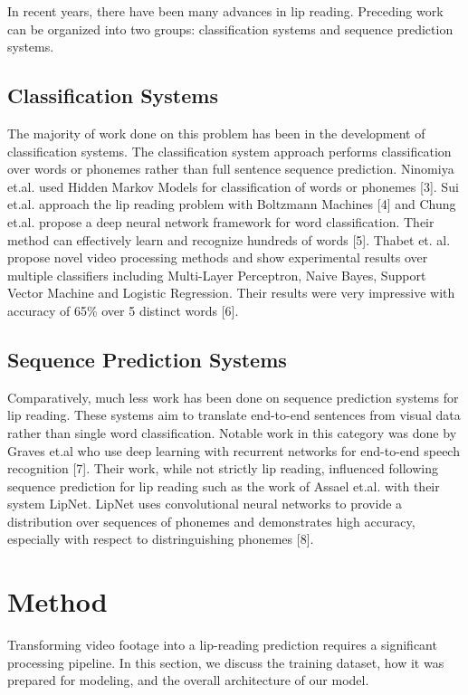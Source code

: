 \documentclass{article}
\begin{document}
In recent years, there have been many advances in lip reading. Preceding work can be organized into two groups: classification systems and sequence prediction systems. 

\subsection{Classification Systems}

The majority of work done on this problem has been in the development of classification systems. The classification system approach performs classification over words or phonemes rather than full sentence sequence prediction. Ninomiya et.al. used Hidden Markov Models for classification of words or phonemes [3]. Sui et.al. approach the lip reading problem with Boltzmann Machines [4] and Chung et.al. propose a deep neural network framework for word classification. Their method can effectively learn and recognize hundreds of words [5]. Thabet et. al. propose novel video processing methods and show experimental results over multiple classifiers including Multi-Layer Perceptron, Naive Bayes, Support Vector Machine and Logistic Regression. Their results were very impressive with accuracy of 65\% over 5 distinct words [6].

\subsection{Sequence Prediction Systems}

Comparatively, much less work has been done on sequence prediction systems for lip reading. These systems aim to translate end-to-end sentences from visual data rather than single word classification. Notable work in this category was done by Graves et.al who use deep learning with recurrent networks for end-to-end speech recognition [7]. Their work, while not strictly lip reading, influenced following sequence prediction for lip reading such as the work of Assael et.al. with their system LipNet. LipNet uses convolutional neural networks to provide a distribution over sequences of phonemes and demonstrates high accuracy, especially with respect to distringuishing phonemes [8].

\section{Method}

Transforming video footage into a lip-reading prediction requires a significant processing pipeline. In this section, we discuss the training dataset, how it was prepared for modeling, and the overall architecture of our model.
\end{document}
